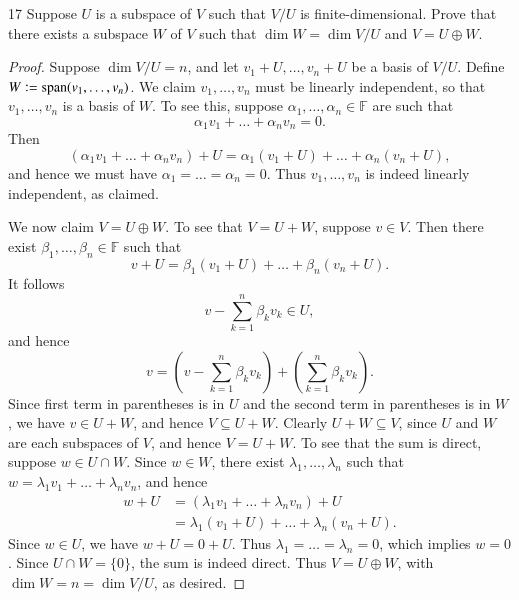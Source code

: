 \documentclass[11pt]{extarticle}
\newenvironment{problem}[1]{\begin{prob*}{#1}{}}{\end{prob*}}
\newcommand{\F}{\mathbb{F}}
\DeclareMathOperator{\Span}{span}
\newcommand{\defeq}{\vcentcolon=}
\begin{document}
\begin{problem}{17}
Suppose $U$ is a subspace of $V$ such that $V/U$ is finite-dimensional.  Prove that there exists a subspace $W$ of $V$ such that $\dim W = \dim V/U$ and $V = U\oplus W$.  
\end{problem}
\begin{proof}
Suppose $\dim V/U = n$, and let $v_1 + U,\dots, v_n + U$ be a basis of $V/U$.  Define  $W \defeq \Span(v_1,\dots, v_n)$.  We claim $v_1,\dots, v_n$ must be linearly independent, so that $v_1,\dots, v_n$ is a basis of $W$.  To see this, suppose $\alpha_1,\dots,\alpha_n\in\F$ are such that
\begin{equation*}
\alpha_1v_1 + \dots + \alpha_nv_n = 0.
\end{equation*}
Then
\begin{equation*}
(\alpha_1v_1 + \dots + \alpha_nv_n) + U = \alpha_1(v_1 + U) + \dots + \alpha_n(v_n + U),
\end{equation*}
and hence we must have $\alpha_1= \dots = \alpha_n=0$.  Thus $v_1,\dots,v_n$ is indeed linearly independent, as claimed. 
\par We now claim $V = U\oplus W$.  To see that $V = U + W$, suppose $v\in V$.  Then there exist $\beta_1,\dots, \beta_n\in\F$ such that 
\begin{equation*}
v + U = \beta_1(v_1 + U) + \dots + \beta_n(v_n + U).
\end{equation*}
It follows
\begin{equation*}
v - \sum_{k=1}^n\beta_kv_k\in U,
\end{equation*}
and hence
\begin{equation*}
v = \left(v - \sum_{k=1}^n\beta_kv_k\right) + \left(\sum_{k=1}^n\beta_kv_k\right).
\end{equation*}
Since first term in parentheses is in $U$ and the second term in parentheses is in $W$, we have $v \in U + W$, and hence $V \subseteq U + W$.  Clearly $U + W\subseteq V$, since $U$ and $W$ are each subspaces of $V$, and hence $V = U + W$.  To see that the sum is direct, suppose $w\in U \cap W$.  Since $w\in W$, there exist $\lambda_1,\dots,\lambda_n$ such that $w = \lambda_1v_1 + \dots + \lambda_nv_n$, and hence 
\begin{align*}
w + U &= (\lambda_1v_1 + \dots + \lambda_nv_n) + U\\
&= \lambda_1(v_1 + U) + \dots + \lambda_n(v_n + U).
\end{align*}  
Since $w\in U$, we have $w + U = 0 + U$.  Thus $\lambda_1 = \dots = \lambda_n = 0$, which implies $w = 0$.  Since $U\cap W = \{0\}$, the sum is indeed direct.  Thus $V = U \oplus W$, with $\dim W = n = \dim V/U$, as desired.
\end{proof}
\end{document}
